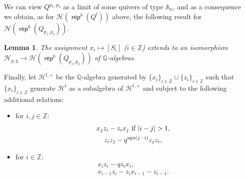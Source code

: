 \documentclass[reqno,12pt,a4paper]{amsart}
\newtheorem{lemma}[theorem]{Lemma}
\theoremstyle{remark}
\theoremstyle{definition}
\newcommand{\opname}[1]{\operatorname{\mathsf{#1}}}
\newcommand{\rep}{\opname{rep}\nolimits}
\newcommand{\ch}{{\mathcal H}}
\numberwithin{equation}{section}
\begin{document}
We can view $Q^{p_1,p_2}$ as a limit of some quivers of type $\mathbb{A}_n$, and as a consequence we obtain, as for $\ch(\rep^b(Q^l))$ above, the following result for $\mathcal{H}(\rep^b(Q_{p_1,p_2}))$.

\begin{lemma}
\label{lem:RH-algebra-of-quiver-with-zigzag-orientation}
The assignment $x_i\mapsto [S_i]$ ($i\in\mathbb{Z}$) extends to an isomorphism $\ch_{p,q}\to\ch(\rep^b(Q_{p_1,p_2}))$ of $\mathbb{Q}$-algebras.
\end{lemma}




Finally, let $\ch^{l,+}$ be the $\mathbb{Q}$-algebra generated by $\{x_i\}_{i\in\mathbb{Z}}\cup \{z_i\}_{i\in\mathbb{Z}}$ such that $\{x_i\}_{i\in\mathbb{Z}}$ generate $\ch^{l}$ as a subalgebra of $\ch^{l,+}$ and subject to the following additional relations:
\begin{itemize}
	\item for $i,j\in\mathbb{Z}$:
	\begin{gather*}
		 x_jz_i-z_ix_j ~\hbox{if $|i-j|>1$},\\
		 z_iz_j-q^{\mathrm{sgn}(j-i)}z_jz_i, 
	\end{gather*}
	\item for $i\in\mathbb{Z}$:
	\begin{gather*}
		x_iz_i-qz_ix_i,\\
		x_{i-1}z_{i}-z_{i}x_{i-1}-z_{i-1}.
	\end{gather*}
\end{itemize}
\end{document}
